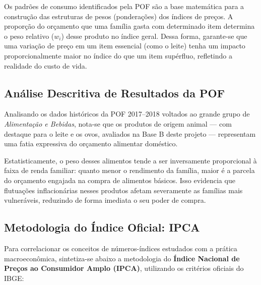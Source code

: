 \documentclass[12pt,a4paper]{article}
\begin{document}
Os padrões de consumo identificados pela POF são a base matemática para a construção das estruturas de pesos (ponderações) dos índices de preços. A proporção do orçamento que uma família gasta com determinado item determina o peso relativo ($w_i$) desse produto no índice geral. Dessa forma, garante-se que uma variação de preço em um item essencial (como o leite) tenha um impacto proporcionalmente maior no índice do que um item supérfluo, refletindo a realidade do custo de vida.

\subsection{Análise Descritiva de Resultados da POF}
Analisando os dados históricos da POF 2017--2018 voltados ao grande grupo de \textit{Alimentação e Bebidas}, nota-se que os produtos de origem animal --- com destaque para o leite e os ovos, avaliados na Base B deste projeto --- representam uma fatia expressiva do orçamento alimentar doméstico. 

Estatisticamente, o peso desses alimentos tende a ser inversamente proporcional à faixa de renda familiar: quanto menor o rendimento da família, maior é a parcela do orçamento engajada na compra de alimentos básicos. Isso evidencia que flutuações inflacionárias nesses produtos afetam severamente as famílias mais vulneráveis, reduzindo de forma imediata o seu poder de compra.

\subsection{Metodologia do Índice Oficial: IPCA}
Para correlacionar os conceitos de números-índices estudados com a prática macroeconômica, sintetiza-se abaixo a metodologia do \textbf{Índice Nacional de Preços ao Consumidor Amplo (IPCA)}, utilizando os critérios oficiais do IBGE:
\end{document}
